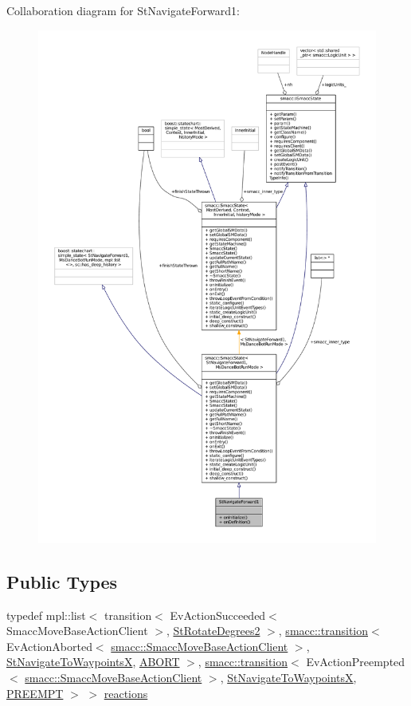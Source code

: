 Collaboration diagram for St\+Navigate\+Forward1\+:
\nopagebreak
\begin{figure}[H]
\begin{center}
\leavevmode
\includegraphics[width=350pt]{structStNavigateForward1__coll__graph}
\end{center}
\end{figure}
\subsection*{Public Types}
\begin{DoxyCompactItemize}
\item 
typedef mpl\+::list$<$ transition$<$ Ev\+Action\+Succeeded$<$ Smacc\+Move\+Base\+Action\+Client $>$, \hyperlink{structStRotateDegrees2}{St\+Rotate\+Degrees2} $>$, \hyperlink{classsmacc_1_1transition}{smacc\+::transition}$<$ Ev\+Action\+Aborted$<$ \hyperlink{classsmacc_1_1SmaccMoveBaseActionClient}{smacc\+::\+Smacc\+Move\+Base\+Action\+Client} $>$, \hyperlink{structStNavigateToWaypointsX}{St\+Navigate\+To\+WaypointsX}, \hyperlink{classABORT}{A\+B\+O\+RT} $>$, \hyperlink{classsmacc_1_1transition}{smacc\+::transition}$<$ Ev\+Action\+Preempted$<$ \hyperlink{classsmacc_1_1SmaccMoveBaseActionClient}{smacc\+::\+Smacc\+Move\+Base\+Action\+Client} $>$, \hyperlink{structStNavigateToWaypointsX}{St\+Navigate\+To\+WaypointsX}, \hyperlink{classPREEMPT}{P\+R\+E\+E\+M\+PT} $>$ $>$ \hyperlink{structStNavigateForward1_a12580ca7fde6a5e5abb27ff3995aaa25}{reactions}
\end{DoxyCompactItemize}
